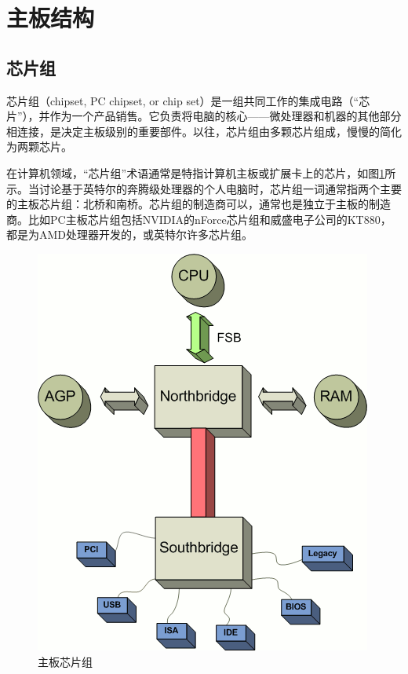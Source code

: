 \section{主板结构}

\subsection{芯片组}
芯片组（chipset, PC chipset, or chip set）是一组共同工作的集成电路（“芯片”），并作为一个产品销售。它负责将电脑的核心——微处理器和机器的其他部分相连接，是决定主板级别的重要部件。以往，芯片组由多颗芯片组成，慢慢的简化为两颗芯片。

在计算机领域，“芯片组”术语通常是特指计算机主板或扩展卡上的芯片，如图\ref{fig:chipset}所示。当讨论基于英特尔的奔腾级处理器的个人电脑时，芯片组一词通常指两个主要的主板芯片组：北桥和南桥。芯片组的制造商可以，通常也是独立于主板的制造商。比如PC主板芯片组包括NVIDIA的nForce芯片组和威盛电子公司的KT880，都是为AMD处理器开发的，或英特尔许多芯片组。
\begin{figure}[ht]
	\begin{center}
		\includegraphics[keepaspectratio,width=0.5\paperwidth]{Pictures/Schema_chipsatz.png}
	\end{center}
	\caption{主板芯片组}
	\label{fig:chipset}
\end{figure}

